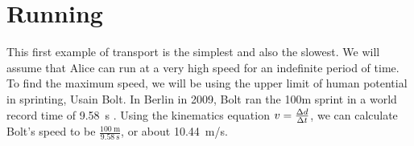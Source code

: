\section{Running}
	This first example of transport is the simplest and also the slowest.
	We will assume that Alice can run at a very high speed for an indefinite period of time.
	To find the maximum speed, we will be using the upper limit of human potential in sprinting, Usain Bolt.
	In Berlin in 2009, Bolt ran the 100m sprint in a world record time of \SI{9.58}{\second} \autocite{boltRunning}.
	Using the kinematics equation $v = \frac{\mathrm{\Delta} d}{\mathrm{\Delta} t}$, we can calculate Bolt's speed to be $\frac{\SI{100}{\metre}}{\SI{9.58}{\second}}$, or about \SI{10.44}{\metre/\second}.

